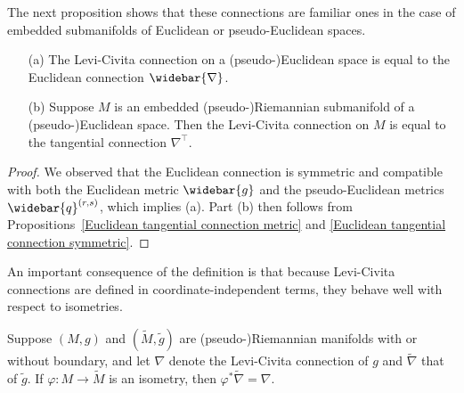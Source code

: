 The next proposition shows that these connections are familiar ones in the case of embedded submanifolds of Euclidean or pseudo-Euclidean spaces.
\begin{proposition}\label{Levi-Civita Euclidean}
\mbox{}
\begin{itemize}
\item[(a)] The Levi-Civita connection on a (pseudo-)Euclidean space is equal to the Euclidean connection $\widebar{\nabla}$.
\item[(b)] Suppose $M$ is an embedded (pseudo-)Riemannian submanifold of a (pseudo-)Euclidean space. Then the Levi-Civita connection on $M$ is equal to the tangential 
connection $\nabla^{\top}$.
\end{itemize}
\end{proposition}
\begin{proof}
We observed that the Euclidean connection is symmetric and compatible with both the Euclidean metric $\widebar{g}$ and the pseudo-Euclidean metrics $\widebar{q}^{(r,s)}$, 
which implies (a). Part (b) then follows from Propositions~\ref{Euclidean tangential connection metric} and \ref{Euclidean tangential connection symmetric}.
\end{proof}
An important consequence of the definition is that because Levi-Civita connections are defined in coordinate-independent terms, they behave well with respect to isometries.
\begin{proposition}
Suppose $(M,g)$ and $(\widetilde{M},\tilde{g})$ are (pseudo-)Riemannian manifolds with or without boundary, and let $\nabla$ denote the Levi-Civita connection 
of $g$ and $\widetilde{\nabla}$ that of $\tilde{g}$. If $\varphi:M\to\widetilde{M}$ is an isometry, then $\varphi^*\widetilde{\nabla}=\nabla$.
\end{proposition}
